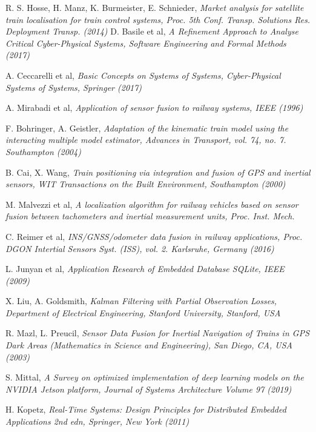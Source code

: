 \begin{thebibliography}{9}
R. S. Hosse, H. Manz, K. Burmeister, E. Schnieder, \textit{Market
analysis for satellite train localisation for train control systems,
Proc. 5th Conf. Transp. Solutions Res. Deployment Transp. (2014)}
D. Basile et al, \textit{A Refinement Approach to Analyse Critical Cyber-Physical Systems,
Software Engineering and Formal Methods  (2017)}

A. Ceccarelli et al, \emph{Basic Concepts on Systems of Systems, Cyber-Physical Systems of Systems, Springer (2017)}


A. Mirabadi et al, \textit{Application of sensor fusion to railway systems, IEEE (1996)}

F. Bohringer, A. Geistler, \textit{Adaptation of the kinematic train
	model using the interacting multiple model estimator, Advances in
	Transport, vol. 74, no. 7. Southampton (2004)}

B. Cai, X. Wang, \textit{Train positioning via integration and
fusion of GPS and inertial sensors, WIT Transactions on the Built Environment, Southampton (2000)}

M. Malvezzi et al, \textit{A localization algorithm for railway vehicles based on sensor fusion between tachometers and inertial measurement units, Proc. Inst. Mech.}

C. Reimer et al, \textit{INS/GNSS/odometer
data fusion in railway applications, Proc. DGON Intertial Sensors
Syst. (ISS), vol. 2. Karlsruhe, Germany (2016)} 

L. Junyan et al, \textit{Application Research of Embedded Database SQLite, IEEE (2009)}

X. Liu, A. Goldsmith, \textit{
Kalman  Filtering with Partial Observation Losses, Department of Electrical Engineering, Stanford University, Stanford, USA}

R. Mazl, L. Preucil, \textit{Sensor Data Fusion for Inertial Navigation of
Trains in GPS Dark Areas (Mathematics in Science and Engineering),
San Diego, CA, USA (2003)}

S. Mittal, \textit{A Survey on optimized implementation of deep learning models on the NVIDIA Jetson platform, Journal of Systems Architecture
Volume 97 (2019)}
	

H. Kopetz, \textit{Real-Time Systems: Design Principles for Distributed Embedded Applications 2nd edn, Springer, New York (2011)}


\end{thebibliography}
